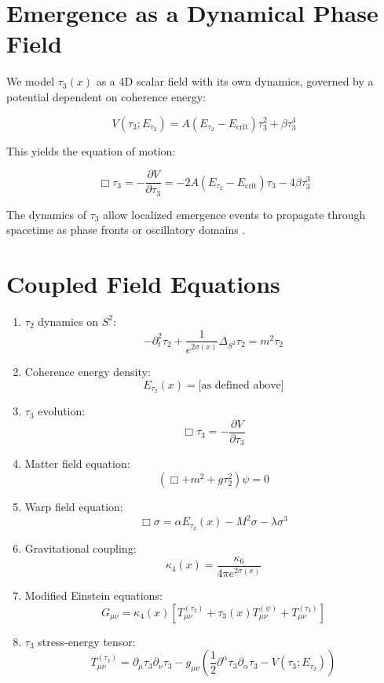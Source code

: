 \documentclass[12pt]{article}
\begin{document}
\section{Emergence as a Dynamical Phase Field}

We model $\tau_3(x)$ as a 4D scalar field with its own dynamics, governed by a potential dependent on coherence energy:

\[
V(\tau_3; E_{\tau_2}) = A (E_{\tau_2} - E_{\text{crit}}) \tau_3^2 + \beta \tau_3^4
\]

This yields the equation of motion:

\[
\Box \tau_3 = -\frac{\partial V}{\partial \tau_3} = -2A(E_{\tau_2} - E_{\text{crit}})\tau_3 - 4\beta \tau_3^3
\]

The dynamics of $\tau_3$ allow localized emergence events to propagate through spacetime as phase fronts or oscillatory domains \cite{birrell1982}.

\section{Coupled Field Equations}

\begin{enumerate}
    \item $\tau_2$ dynamics on $S^2$:
    \[
    -\partial_t^2 \tau_2 + \frac{1}{e^{2\sigma(x)}} \Delta_{S^2} \tau_2 = m^2 \tau_2
    \]
    \item Coherence energy density:
    \[
    E_{\tau_2}(x) = \text{[as defined above]}
    \]
    \item $\tau_3$ evolution:
    \[
    \Box \tau_3 = -\frac{\partial V}{\partial \tau_3}
    \]
    \item Matter field equation:
    \[
    \left( \Box + m^2 + g \tau_2^2 \right)\psi = 0
    \]
    \item Warp field equation:
    \[
    \Box \sigma = \alpha E_{\tau_2}(x) - M^2 \sigma - \lambda \sigma^3
    \]
    \item Gravitational coupling:
    \[
    \kappa_4(x) = \frac{\kappa_6}{4\pi e^{2\sigma(x)}}
    \]
    \item Modified Einstein equations:
    \[
    G_{\mu\nu} = \kappa_4(x) \left[
    T_{\mu\nu}^{(\tau_2)} +
    \tau_3(x) T_{\mu\nu}^{(\psi)} +
    T_{\mu\nu}^{(\tau_3)}
    \right]
    \]
    \item $\tau_3$ stress-energy tensor:
    \[
    T_{\mu\nu}^{(\tau_3)} = \partial_\mu \tau_3 \partial_\nu \tau_3 -
    g_{\mu\nu} \left( \frac{1}{2} \partial^\alpha \tau_3 \partial_\alpha \tau_3 - V(\tau_3; E_{\tau_2}) \right)
    \]
\end{enumerate}
\end{document}
